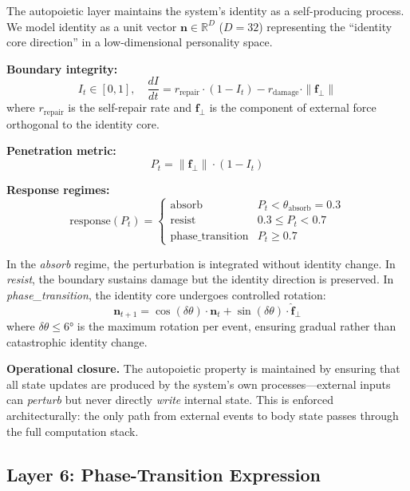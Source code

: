 \documentclass[10pt,twocolumn]{article}
\begin{document}
The autopoietic layer maintains the system's identity as a self-producing process. We model identity as a unit vector $\mathbf{n} \in \mathbb{R}^D$ ($D=32$) representing the ``identity core direction'' in a low-dimensional personality space.

\textbf{Boundary integrity:}
\begin{equation}
I_t \in [0,1], \quad \frac{dI}{dt} = r_{\text{repair}} \cdot (1 - I_t) - r_{\text{damage}} \cdot \|\mathbf{f}_\perp\|
\label{eq:integrity}
\end{equation}
where $r_{\text{repair}}$ is the self-repair rate and $\mathbf{f}_\perp$ is the component of external force orthogonal to the identity core.

\textbf{Penetration metric:}
\begin{equation}
P_t = \|\mathbf{f}_\perp\| \cdot (1 - I_t)
\label{eq:penetration}
\end{equation}

\textbf{Response regimes:}
\begin{equation}
\text{response}(P_t) = \begin{cases}
\text{absorb} & P_t < \theta_{\text{absorb}} = 0.3 \\
\text{resist} & 0.3 \leq P_t < 0.7 \\
\text{phase\_transition} & P_t \geq 0.7
\end{cases}
\end{equation}

In the \emph{absorb} regime, the perturbation is integrated without identity change. In \emph{resist}, the boundary sustains damage but the identity direction is preserved. In \emph{phase\_transition}, the identity core undergoes controlled rotation:
\begin{equation}
\mathbf{n}_{t+1} = \cos(\delta\theta) \cdot \mathbf{n}_t + \sin(\delta\theta) \cdot \hat{\mathbf{f}}_\perp
\label{eq:rotation}
\end{equation}
where $\delta\theta \leq 6°$ is the maximum rotation per event, ensuring gradual rather than catastrophic identity change.

\textbf{Operational closure.} The autopoietic property is maintained by ensuring that all state updates are produced by the system's own processes---external inputs can \emph{perturb} but never directly \emph{write} internal state. This is enforced architecturally: the only path from external events to body state passes through the full computation stack.

\subsection{Layer 6: Phase-Transition Expression}
\end{document}
